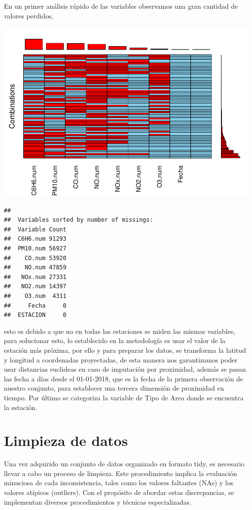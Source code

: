 \documentclass[notspecified,article,submit,moreauthors,pdftex]{Definitions/mdpi}
\begin{document}
En un primer análisis rápido de las variables observamos una gran
cantidad de valores perdidos,

\includegraphics{ProyectoAED2023_files/figure-latex/unnamed-chunk-5-1.pdf}

\begin{verbatim}
## 
##  Variables sorted by number of missings: 
##  Variable Count
##  C6H6.num 91293
##  PM10.num 56927
##    CO.num 53920
##    NO.num 47859
##   NOx.num 27331
##   NO2.num 14397
##    O3.num  4311
##     Fecha     0
##  ESTACION     0
\end{verbatim}

esto es debido a que no en todas las estaciones se miden las mismas
variables, para solucionar esto, lo establecido en la metodología es
usar el valor de la estación más próxima, por ello y para preparar los
datos, se transforma la latitud y longitud a coordenadas proyectadas, de
esta manera nos garantizamos poder usar distancias euclideas en caso de
imputación por proximidad, además se pasan las fecha a días desde el
01-01-2018, que es la fecha de la primera observación de nuestro
conjunto, para establecer una tercera dimensión de proximidad en tiempo.
Por último se categoriza la variable de Tipo de Area donde se encuentra
la estación.

\hypertarget{limpieza-de-datos}{%
\section{Limpieza de datos}\label{limpieza-de-datos}}

Una vez adquirido un conjunto de datos organizado en formato tidy, es
necesario llevar a cabo un proceso de limpieza. Este procedimiento
implica la evaluación minuciosa de cada inconsistencia, tales como los
valores faltantes (NAs) y los valores atípicos (outliers). Con el
propósito de abordar estas discrepancias, se implementan diversos
procedimientos y técnicas especializadas.
\end{document}
